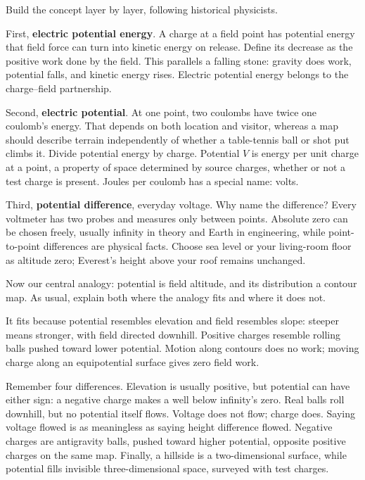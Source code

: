 \begin{mainline}
Build the concept layer by layer, following historical physicists.

First, \textbf{electric potential energy}. A charge at a field point has potential energy that field force can turn into kinetic energy on release. Define its decrease as the positive work done by the field. This parallels a falling stone: gravity does work, potential falls, and kinetic energy rises. Electric potential energy belongs to the charge--field partnership.

Second, \textbf{electric potential}. At one point, two coulombs have twice one coulomb's energy. That depends on both location and visitor, whereas a map should describe terrain independently of whether a table-tennis ball or shot put climbs it. Divide potential energy by charge. Potential \(V\) is energy per unit charge at a point, a property of space determined by source charges, whether or not a test charge is present. Joules per coulomb has a special name: volts.

Third, \textbf{potential difference}, everyday voltage. Why name the difference? Every voltmeter has two probes and measures only between points. Absolute zero can be chosen freely, usually infinity in theory and Earth in engineering, while point-to-point differences are physical facts. Choose sea level or your living-room floor as altitude zero; Everest's height above your roof remains unchanged.

Now our central analogy: potential is field altitude, and its distribution a contour map. As usual, explain both where the analogy fits and where it does not.

It fits because potential resembles elevation and field resembles slope: steeper means stronger, with field directed downhill. Positive charges resemble rolling balls pushed toward lower potential. Motion along contours does no work; moving charge along an equipotential surface gives zero field work.

Remember four differences. Elevation is usually positive, but potential can have either sign: a negative charge makes a well below infinity's zero. Real balls roll downhill, but no potential itself flows. Voltage does not flow; charge does. Saying voltage flowed is as meaningless as saying height difference flowed. Negative charges are antigravity balls, pushed toward higher potential, opposite positive charges on the same map. Finally, a hillside is a two-dimensional surface, while potential fills invisible three-dimensional space, surveyed with test charges.


\end{mainline}
